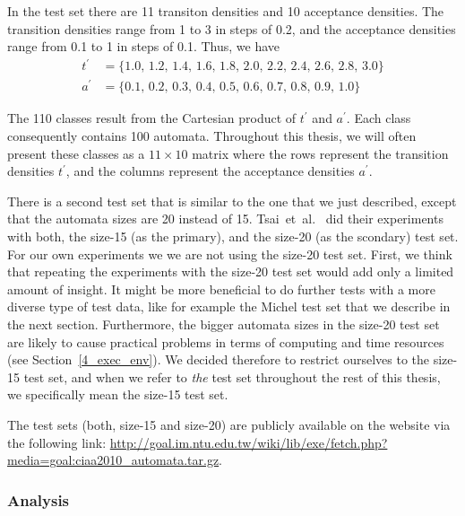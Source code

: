 In the \goal{} test set there are 11 transiton densities and 10 acceptance densities. The transition densities range from 1 to 3 in steps of 0.2, and the acceptance densities range from 0.1 to 1 in steps of 0.1. Thus, we have
\begin{align*}
t^\prime& = \{ 1.0,\,1.2,\,1.4,\,1.6,\,1.8,\,2.0,\,2.2,\,2.4,\,2.6,\,2.8,\,3.0 \} \\
a^\prime & = \{ 0.1,\,0.2,\,0.3,\,0.4,\,0.5,\,0.6,\,0.7,\,0.8,\,0.9,\,1.0 \}
\end{align*}

The 110 classes result from the Cartesian product of $t^\prime$ and $a^\prime$. Each class consequently contains 100 automata. Throughout this thesis, we will often present these classes as a $11 \times 10$ matrix where the rows represent the transition densities $t^\prime$, and the columns represent the acceptance densities $a^\prime$.

There is a second \goal{} test set that is similar to the one that we just described, except that the automata sizes are 20 instead of 15. Tsai~et~al.~\cite{2010_tsai} did their experiments with both, the size-15 (as the primary), and the size-20 (as the scondary) test set. For our own experiments we we are not using the size-20 test set. First, we think that repeating the experiments with the size-20 test set would add only a limited amount of insight. It might be more beneficial to do further tests with a more diverse type of test data, like for example the Michel test set that we describe in the next section. Furthermore, the bigger automata sizes in the size-20 test set are likely to cause practical problems in terms of computing and time resources (see Section~\ref{4_exec_env}). We decided therefore to restrict ourselves to the size-15 test set, and when we refer to \textit{the} \goal{} test set throughout the rest of this thesis, we specifically mean the size-15 test set.

The \goal{} test sets (both, size-15 and size-20) are publicly available on the \goal{} website via the following link: \url{http://goal.im.ntu.edu.tw/wiki/lib/exe/fetch.php?media=goal:ciaa2010_automata.tar.gz}.

\subsubsection{Analysis}

